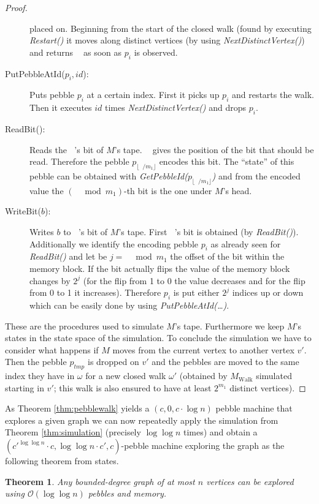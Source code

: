 \documentclass[oneside]{scrartcl}
\newtheorem{thm}{Theorem}
\DeclareMathOperator{\Tid}{T_{\text{id}}}
\DeclareMathOperator{\Thead}{T_{\text{head}}}
\begin{document}
\begin{proof}
\begin{description}
      placed on. Beginning from the start of the closed walk
      (found by executing \emph{Restart()} it moves along distinct vertices
      (by using \emph{NextDistinctVertex()}) and returns $\Tid$ as soon as
      $p_{i}$ is observed.
    \item[PutPebbleAtId($p_{i},\mathit{id}$):] Puts pebble $p_i$ at a certain
      index. First it picks up $p_{i}$ and restarts the walk. Then it executes
      $\mathit{id}$ times \emph{NextDistinctVertex()} and drops $p_{i}$.
    \item[ReadBit():] Reads the $\Thead$'s bit of $M$'s tape. $\Thead$ gives
      the position of the bit that should be read. Therefore the pebble
      $p_{\lfloor \Thead/m_{1}\rfloor}$ encodes this bit. The \enquote{state}
      of this pebble can be obtained with
      \emph{GetPebbleId($p_{\lfloor \Thead/m_{1}\rfloor}$)} and from the
      encoded value the $(\Thead\mod m_{1})$-th bit is the one under $M$'s
      head.
    \item[WriteBit($b$):] Writes $b$ to $\Thead$'s bit of $M$'s tape. First
      $\Thead$'s bit is obtained (by \emph{ReadBit()}). Additionally we
      identify the encoding pebble $p_{i}$ as already seen for
      \emph{ReadBit()} and let be $j = \Thead\mod m_{1}$ the offset of the bit
      within the memory block. If the bit actually flips the value of the
      memory block changes by $2^j$ (for the flip from 1 to 0 the value
      decreases and for the flip from 0 to 1 it increases). Therefore $p_{i}$
      is put either $2^j$ indices up or down which can be easily done by using
      \emph{PutPebbleAtId(\dots)}.
  \end{description}
  These are the procedures used to simulate $M$'s tape. Furthermore we keep
  $M$'s states in the state space of the simulation. To conclude the simulation
  we have to consider what happens if $M$ moves from the current vertex to
  another vertex $v'$. Then the pebble $p_{tmp}$ is dropped on $v'$ and the
  pebbles are moved to the same index they have in $\omega$ for a new closed
  walk $\omega'$ (obtained by $M_{\text{Walk}}$ simulated starting in $v'$;
  this walk is also ensured to have at least $2^{m_1}$ distinct vertices).
\end{proof}

As Theorem \ref{thm:pebblewalk} yields a $(c,0,c\cdot\log n)$ pebble machine
that explores a given graph we can now repeatedly apply the simulation
from Theorem \ref{thm:simulation} (precisely $\log\log n$ times) and obtain
a $(c'^{\log\log n}\cdot c, \log\log n\cdot c', c)$-pebble machine exploring
the graph as the following theorem from \cite{pebbles} states.
\begin{thm}
  Any bounded-degree graph of at most $n$ vertices can be explored using
  $\mathcal{O}(\log \log n)$ pebbles and memory.
\end{thm}
\end{document}
